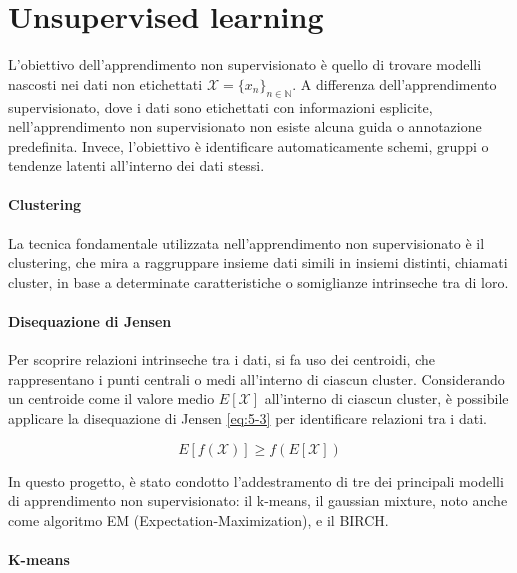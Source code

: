 \section{Unsupervised learning}

L'obiettivo dell'apprendimento non supervisionato è quello di trovare modelli nascosti nei dati non etichettati \( \mathcal{X} = \{ x_n \}_{n \in \mathbb{N}} \). A differenza dell'apprendimento supervisionato, dove i dati sono etichettati con informazioni esplicite, nell'apprendimento non supervisionato non esiste alcuna guida o annotazione predefinita. Invece, l'obiettivo è identificare automaticamente schemi, gruppi o tendenze latenti all'interno dei dati stessi.

\paragraph{Clustering}

La tecnica fondamentale utilizzata nell'apprendimento non supervisionato è il clustering, che mira a raggruppare insieme dati simili in insiemi distinti, chiamati cluster, in base a determinate caratteristiche o somiglianze intrinseche tra di loro.

\paragraph{Disequazione di Jensen}

Per scoprire relazioni intrinseche tra i dati, si fa uso dei centroidi, che rappresentano i punti centrali o medi all'interno di ciascun cluster. Considerando un centroide come il valore medio \( E[\mathcal{X}] \) all'interno di ciascun cluster, è possibile applicare la disequazione di Jensen \ref{eq:5-3} per identificare relazioni tra i dati.

\begin{equation}
    \boxed{
        E[f(\mathcal{X})] \geq f(E[\mathcal{X}])
    }
    \label{eq:5-3}
\end{equation}

\bigskip

In questo progetto, è stato condotto l'addestramento di tre dei principali modelli di apprendimento non supervisionato: il k-means, il gaussian mixture, noto anche come algoritmo EM (Expectation-Maximization), e il BIRCH.

\paragraph{K-means}

